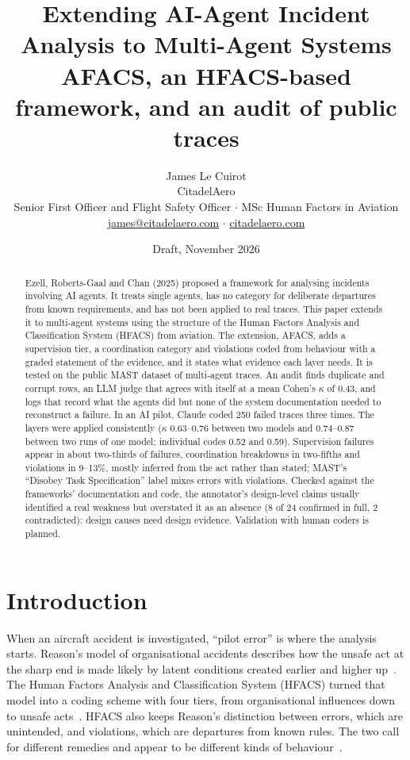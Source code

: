 \documentclass[10pt,a4paper]{article}
\title{\vspace{-1.5em}\textbf{Extending AI-Agent Incident Analysis to Multi-Agent Systems}\\[0.3em]
\large AFACS, an HFACS-based framework, and an audit of public traces}
\author{James Le Cuirot\\
\small CitadelAero\\
\small Senior First Officer and Flight Safety Officer $\cdot$ MSc Human Factors in Aviation\\
\small \href{mailto:james@citadelaero.com}{james@citadelaero.com} $\cdot$ \href{https://citadelaero.com}{citadelaero.com}}
\date{Draft, November 2026}
\begin{document}
\maketitle
\thispagestyle{fancy}

\begin{abstract}
\noindent
Ezell, Roberts-Gaal and Chan (2025) proposed a framework for analysing incidents
involving AI agents. It treats single agents, has no category for deliberate
departures from known requirements, and has not been applied to real traces.
This paper extends it to multi-agent systems using the structure of the Human
Factors Analysis and Classification System (HFACS) from aviation. The extension,
AFACS, adds a supervision tier, a coordination category and violations coded from
behaviour with a graded statement of the evidence, and it states what evidence
each layer needs. It is tested on the public MAST dataset of multi-agent traces.
An audit finds duplicate and corrupt rows, an LLM judge that agrees with itself at
a mean Cohen's $\kappa$ of 0.43, and logs that record what the agents did but
none of the system documentation needed to reconstruct a failure. In an AI pilot,
Claude coded 250 failed traces three times. The layers were applied consistently
($\kappa$ 0.63--0.76 between two models and 0.74--0.87 between two runs of one
model; individual codes 0.52 and 0.59). Supervision failures appear in about
two-thirds of failures, coordination breakdowns in two-fifths and violations in
9--13\%, mostly inferred from the act rather than stated; MAST's ``Disobey Task
Specification'' label mixes errors with violations. Checked against the
frameworks' documentation and code, the annotator's design-level claims usually
identified a real weakness but overstated it as an absence (8 of 24 confirmed in
full, 2 contradicted): design causes need design evidence. Validation with human
coders is planned.
\end{abstract}

\section{Introduction}

When an aircraft accident is investigated, ``pilot error'' is where the analysis
starts. Reason's model of organisational accidents describes how the unsafe act
at the sharp end is made likely by latent conditions created earlier and higher
up~\cite{reason1990human,reason1997managing}. The Human Factors Analysis and
Classification System (HFACS) turned that model into a coding scheme with four
tiers, from organisational influences down to unsafe
acts~\cite{shappell2000hfacs,wiegmann2003human}. HFACS also keeps Reason's
distinction between errors, which are unintended, and violations, which are
departures from known rules. The two call for different remedies and appear to be
different kinds of behaviour~\cite{reason1990errors}.
\end{document}
